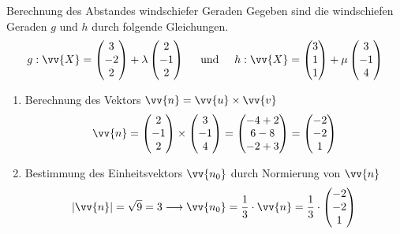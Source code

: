 \begin{bsp}{Berechnung des Abstandes windschiefer Geraden}{}
    Gegeben sind die windschiefen Geraden \(g\) und \(h\) durch folgende Gleichungen. \[g:\vv{X} = \begin{pmatrix}
        3\\-2\\2
    \end{pmatrix} + \lambda \begin{pmatrix}
        2\\-1\\2
    \end{pmatrix} \hspace{0.5cm} \text{und}\hspace{0.5cm} h:\vv{X} = \begin{pmatrix}
        3\\1\\1
    \end{pmatrix} + \mu \begin{pmatrix}
        3\\-1\\4
    \end{pmatrix}\]
    \begin{enumerate}
        \item Berechnung des Vektors \(\vv{n} = \vv{u} \times\vv{v}\)\[\vv{n} = \begin{pmatrix}
        2\\-1\\2
    \end{pmatrix} \times \begin{pmatrix}
        3\\-1\\4
    \end{pmatrix} = \begin{pmatrix}
        -4+2\\6-8\\-2+3
    \end{pmatrix} = \begin{pmatrix}
        -2\\-2\\1
    \end{pmatrix}\]
    \item Bestimmung des Einheitsvektors \(\vv{n_0}\) durch Normierung von \(\vv{n}\)
    \[|\vv{n}| = \sqrt{9} =3 \longrightarrow \vv{n_0} = \dfrac{1}{3}\cdot \vv{n} = \dfrac{1}{3}\cdot \begin{pmatrix}
        -2\\-2\\1

\end{pmatrix}\]
\end{enumerate}
\end{bsp}

